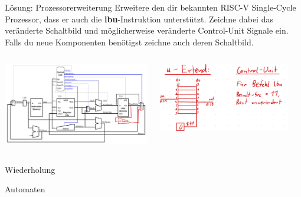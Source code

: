 \documentclass[
  german,            %
  aspectratio=169,    %
]{tumbeamer}
\begin{document}
\begin{frame}[c]{Lösung: Prozessorerweiterung}{}
	Erweitere den dir bekannten RISC-V Single-Cycle Prozessor, dass er auch die \textbf{lbu}-Instruktion unterstützt. Zeichne dabei das veränderte Schaltbild und möglicherweise veränderte Control-Unit Signale ein. Falls du neue Komponenten benötigst zeichne auch deren Schaltbild.
	\vspace{0.5cm}
	\begin{columns}[c]
		\begin{column}{0.5\textwidth}
			\includegraphics[width=1.0\textwidth]{w14_lbu_erweiterung.jpeg}
		\end{column}
		\begin{column}{0.5\textwidth}
			\begin{center}
				\includegraphics[width=0.9\textwidth]{w14_uextend.jpeg}
			\end{center}
		\end{column}
	\end{columns}
\end{frame}



\begin{frame}[c]{Wiederholung}{}
	\begin{center}
	  \LARGE Automaten
	\end{center}
\end{frame}
\end{document}
